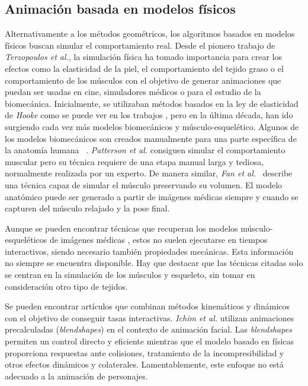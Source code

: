 \subsection{Animación basada en modelos físicos}
\label{art:fisica}

Alternativamente a los métodos geométricos, los algoritmos basados en modelos físicos buscan simular el comportamiento real. Desde el pionero trabajo de \emph{Terzopoulos et al.}\cite{terzopoulos1987elastically}, la simulación física ha tomado importancia para crear los efectos como la elasticidad de la piel, el comportamiento del tejido graso o el comportamiento de los músculos con el objetivo de generar animaciones que puedan ser usadas en cine, simuladores médicos o para el estudio de la biomecánica. 
Inicialmente, se utilizaban métodos basados en la ley de elasticidad de \emph{Hooke} como se puede ver en los trabajos \cite{russell93,wilhelms1995modeling}, pero en la última década, han ido surgiendo cada vez más modelos biomecánicos y músculo-esquelético. Algunos de los modelos biomecánicos son creados manualmente para una parte específica de la anatomía humana ~\cite{Lee2009}. \emph{Patterson et al.} \cite{Patterson2012} consiguen simular el comportamiento muscular pero su técnica requiere de una etapa manual larga y tediosa, normalmente realizada por un experto. De manera similar, \emph{Fan et al.}~ \cite{Fan2014} describe una técnica capaz de simular el músculo preservando su volumen. El modelo anatómico puede ser generado a partir de imágenes médicas siempre y cuando se capturen del músculo relajado y la pose final. 

Aunque se pueden encontrar técnicas que recuperan los modelos músculo-esqueléticos de imágenes médicas \cite{blemker2007, gilles2010, schmid2009}, estos no suelen ejecutarse en tiempos interactivos, siendo necesario también propiedades mecánicas. Esta información no siempre se encuentra disponible. Hay que destacar que las técnicas citadas solo se centran en la simulación de los músculos y esqueleto, sin tomar en consideración otro tipo de tejidos.

Se pueden encontrar artículos que combinan métodos kinemáticos y dinámicos con el objetivo de conseguir tasas interactivas.  \emph{Ichim et al.} \cite{Ichim:2016} utilizan animaciones precalculadas (\emph{blendshapes}) en el contexto de animación facial. Las \emph{blendshapes} permiten un control directo y eficiente mientras que el modelo basado en físicas proporciona respuestas ante colisiones, tratamiento de la incompresibilidad y otros efectos dinámicos y colaterales. Lamentablemente, este enfoque no está adecuado a la animación de personajes. 


